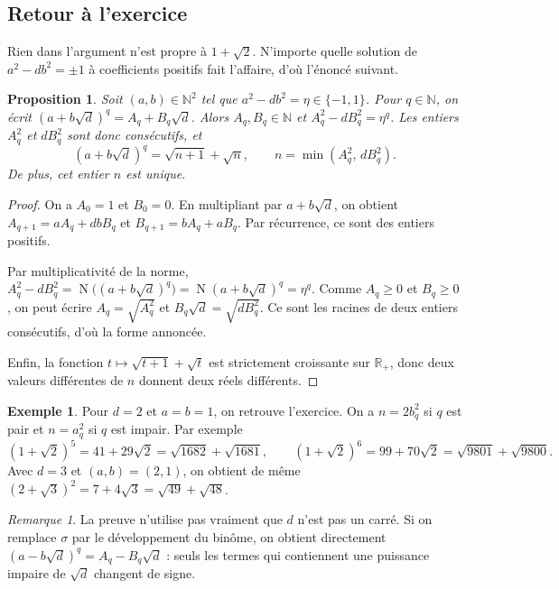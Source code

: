 \documentclass[11pt,a4paper]{article}
\theoremstyle{plain}
\newtheorem{proposition}[theoreme]{Proposition}
\theoremstyle{definition}
\newtheorem{exemple}[theoreme]{Exemple}
\theoremstyle{remark}
\newtheorem{remarque}[theoreme]{Remarque}
\newcommand{\N}{\mathbb{N}}
\newcommand{\R}{\mathbb{R}}
\DeclareMathOperator{\Nm}{N}
\begin{document}
\subsection{Retour à l'exercice}

Rien dans l'argument n'est propre à $1+\sqrt2$. N'importe quelle solution de $a^2-db^2=\pm1$ à coefficients positifs fait l'affaire, d'où l'énoncé suivant.

\begin{proposition}\label{prop:consecutifs}
Soit $(a,b)\in\N^2$ tel que $a^2-db^2=\eta\in\{-1,1\}$. Pour $q\in\N$, on écrit $(a+b\sqrt d)^q=A_q+B_q\sqrt d$. Alors $A_q,B_q\in\N$ et $A_q^2-dB_q^2=\eta^q$. Les entiers $A_q^2$ et $dB_q^2$ sont donc consécutifs, et
\[
  (a+b\sqrt d)^q=\sqrt{n+1}+\sqrt n,\qquad n=\min(A_q^2,\,dB_q^2).
\]
De plus, cet entier $n$ est unique.
\end{proposition}

\begin{proof}
On a $A_0=1$ et $B_0=0$. En multipliant par $a+b\sqrt d$, on obtient $A_{q+1}=aA_q+dbB_q$ et $B_{q+1}=bA_q+aB_q$. Par récurrence, ce sont des entiers positifs.

Par multiplicativité de la norme, $A_q^2-dB_q^2=\Nm\big((a+b\sqrt d)^q\big)=\Nm(a+b\sqrt d)^q=\eta^q$. Comme $A_q\geq0$ et $B_q\geq0$, on peut écrire $A_q=\sqrt{A_q^2}$ et $B_q\sqrt d=\sqrt{dB_q^2}$. Ce sont les racines de deux entiers consécutifs, d'où la forme annoncée.

Enfin, la fonction $t\mapsto\sqrt{t+1}+\sqrt t$ est strictement croissante sur $\R_+$, donc deux valeurs différentes de $n$ donnent deux réels différents.
\end{proof}

\begin{exemple}
Pour $d=2$ et $a=b=1$, on retrouve l'exercice. On a $n=2b_q^2$ si $q$ est pair et $n=a_q^2$ si $q$ est impair. Par exemple
\[
  (1+\sqrt2)^5=41+29\sqrt2=\sqrt{1682}+\sqrt{1681},\qquad
  (1+\sqrt2)^6=99+70\sqrt2=\sqrt{9801}+\sqrt{9800}.
\]
Avec $d=3$ et $(a,b)=(2,1)$, on obtient de même $(2+\sqrt3)^2=7+4\sqrt3=\sqrt{49}+\sqrt{48}$.
\end{exemple}

\begin{remarque}
La preuve n'utilise pas vraiment que $d$ n'est pas un carré. Si on remplace $\sigma$ par le développement du binôme, on obtient directement $(a-b\sqrt d)^q=A_q-B_q\sqrt d$ : seuls les termes qui contiennent une puissance impaire de $\sqrt d$ changent de signe.
\end{remarque}
\end{document}
